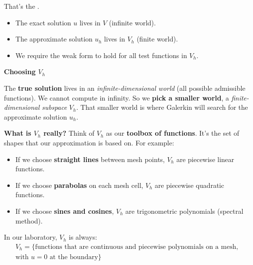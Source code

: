 \newpage

\noindent
That's the .
\begin{itemize}
    \item The exact solution $u$ lives in $V$ (infinite world).
    \item The approximate solution $u_h$ lives in $V_h$ (finite world).
    \item We require the weak form to hold for all test functions in $V_h$.
\end{itemize}

\highspace
\begin{flushleft}
    \textcolor{Green3}{ \textbf{Choosing $V_h$}}
\end{flushleft}
The \textbf{true solution} lives in an \emph{infinite-dimensional world} (all possible admissible functions). We cannot compute in infinity. So we \textbf{pick a smaller world}, a \emph{finite-dimensional subspace} $V_{h}$. That smaller world is where Galerkin will search for the approximate solution $u_{h}$.

\highspace
\textcolor{Green3}{ \textbf{What is $V_{h}$ really?}} Think of $V_{h}$ as our \textbf{toolbox of functions}. It's the set of shapes that our approximation is based on. For example:
\begin{itemize}
    \item If we choose \textbf{straight lines} between mesh points, $V_h$ are piecewise linear functions.
    \item If we choose \textbf{parabolas} on each mesh cell, $V_h$ are piecewise quadratic functions.
    \item If we choose \textbf{sines and cosines}, $V_h$ are trigonometric polynomials (spectral method).
\end{itemize}
In our laboratory, $V_{h}$ is always:
\begin{gather*}
    V_h = \{\text{functions that are continuous and piecewise polynomials on a mesh,} \\
    \text{with } u = 0 \text{ at the boundary}\}
\end{gather*}

